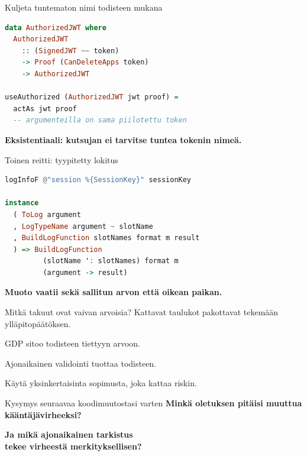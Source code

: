 \documentclass[10pt,aspectratio=169]{beamer}
\newcommand{\bottomline}[2][DeckAccent]{%
  \vfill{\color{#1}\large\bfseries #2}\par
}
\begin{document}
\begin{frame}[fragile]{Kuljeta tuntematon nimi todisteen mukana}
\begin{lstlisting}[style=deckcode,language=Haskell]
data AuthorizedJWT where
  AuthorizedJWT
    :: (SignedJWT ~~ token)
    -> Proof (CanDeleteApps token)
    -> AuthorizedJWT

useAuthorized (AuthorizedJWT jwt proof) =
  actAs jwt proof
  -- argumenteilla on sama piilotettu token
\end{lstlisting}
  \bottomline{Eksistentiaali: kutsujan ei tarvitse tuntea tokenin nimeä.}
\end{frame}

\begin{frame}[fragile]{Toinen reitti: tyypitetty lokitus}
\begin{lstlisting}[style=deckcode,language=Haskell]
logInfoF @"session %{SessionKey}" sessionKey

instance
  ( ToLog argument
  , LogTypeName argument ~ slotName
  , BuildLogFunction slotNames format m result
  ) => BuildLogFunction
         (slotName ': slotNames) format m
         (argument -> result)
\end{lstlisting}
  \bottomline{Muoto vaatii sekä sallitun arvon että oikean paikan.}
\end{frame}

\begin{frame}{Mitkä takuut ovat vaivan arvoisia?}
  \vspace{5mm}
  {\Large Kattavat taulukot pakottavat tekemään ylläpitopäätöksen.}\par
  \vspace{9mm}
  {\color{DeckAccent}\Large GDP sitoo todisteen tiettyyn arvoon.}\par
  \vspace{9mm}
  {\color{DeckBlue}\Large Ajonaikainen validointi tuottaa todisteen.}\par
  \vfill
  {\color{DeckMuted}\Large Käytä yksinkertaisinta sopimusta, joka kattaa riskin.}
\end{frame}

\begin{frame}{Kysymys seuraavaa koodimuutostasi varten}
  \vspace{6mm}
  {\fontsize{26}{31}\selectfont\bfseries
  Minkä oletuksen pitäisi muuttua\\kääntäjävirheeksi?}\par
  \vspace{10mm}
  {\color{DeckAccent}\Large\bfseries
  Ja mikä ajonaikainen tarkistus\\tekee virheestä merkityksellisen?}
\end{frame}
\end{document}
